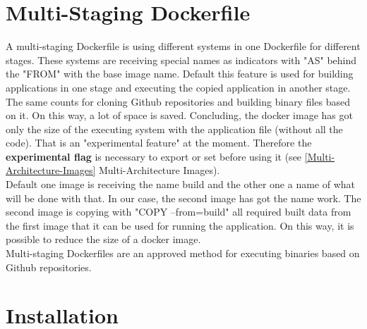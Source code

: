 \section{Multi-Staging Dockerfile}

A multi-staging Dockerfile is using different systems in one Dockerfile for different stages. These systems are receiving special names as indicators with "AS" behind the "FROM" with the base image name. 
Default this feature is used for building applications in one stage and executing the copied application in another stage. The same counts for cloning Github repositories and building binary files based on it. On this way, a lot of space is saved.
Concluding, the docker image has got only the size of the executing system with the application file (without all the code). 
That is an "experimental feature"  at the moment. Therefore the \textbf{experimental flag} is necessary to export or set before using it (see \ref{Multi-Architecture-Images} Multi-Architecture Images). \\
Default one image is receiving the name build and the other one a name of what will be done with that. In our case, the second image has got the name work. 
The second image is copying with "COPY --from=build" all required built data from the first image that it can be used for running the application. 
On this way, it is possible to reduce the size of a docker image. \\
Multi-staging Dockerfiles are an approved method for executing binaries based on Github repositories.


\section{Installation}

